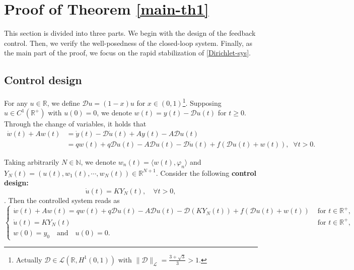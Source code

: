 \documentclass[review]{elsarticle}
\numberwithin{equation}{section}
\begin{document}
\section{Proof of Theorem \ref{main-th1}}\label{sec3}
This section is divided into three parts. We begin with the design of the feedback control. Then, we verify the well-posedness of the closed-loop system. Finally, as the main part of the proof, we focus on the rapid stabilization of \eqref{Dirichlet-sys}.
\subsection{Control design}
 
 For any $u\in \mathbb{R}$, we define $\mathcal{D}u=(1-x)u$ for $x\in(0,1)$\footnote{Actually $\mathcal{D} \in \mathcal{L}(\mathbb{R},H^1(0,1))$ with $\|\mathcal{D}\|_{\mathcal{L}}=\frac{3+\sqrt{3}}{3}>1$.}. Supposing $u\in C^1(\mathbb{R}^+)$ with $u(0)=0$, we denote $w(t)=y(t)-\mathcal{D} u(t)$ for $ t\ge 0$. Through the change of variables, it holds that
\begin{equation*}
    \begin{aligned}
\dot{w}(t)+{A} w (t)& =\dot{y}(t)-\mathcal{D} \dot{u}(t)+A y(t)-A \mathcal{D}u(t) \\
& =q w(t)+q\mathcal{D}u(t)-A \mathcal{D}u(t)-\mathcal{D} \dot{u}(t)+f\left(\mathcal{D}u(t)+w(t)\right), \;\;\forall t>0.
\end{aligned}
\end{equation*}

Taking arbitrarily $N\in \mathbb{N}$, we denote $w_n(t)=\langle w(t),\varphi_n\rangle$ and $ Y_N(t)=
(u(t),w_1(t) ,\cdots ,w_N(t))\in \mathbb{R}^{N+1}$. Consider the following \textbf{control design:}
\begin{equation}
    \label{controller}
    \dot{u}(t)=KY_N(t), \quad \forall t>0, 
\end{equation}
. Then the controlled system reads as
\begin{equation}
    \label{controlled-eqs}
    \left\{\begin{array}{ll}
 \dot{w}(t)+A w (t)=q w(t)+q\mathcal{D}u(t)-A \mathcal{D}u(t)-\mathcal{D} (KY_N(t))+f\left(\mathcal{D}u(t)+w(t)\right)&\text{ for } t\in \mathbb{R}^+,\\[2mm]
\dot{u}(t)=KY_N(t)&\text{ for } t\in  \mathbb{R}^+,\\[2mm]
w(0 )=y_0\quad \text{and} \quad u(0)=0.
\end{array}\right.
\end{equation}
\end{document}
